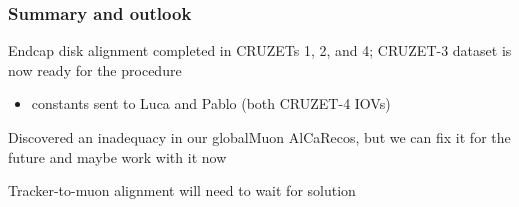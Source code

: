 \documentclass[compress]{beamer}
\begin{document}
\begin{frame}
\frametitle{Summary and outlook}

Endcap disk alignment completed in CRUZETs 1, 2, and 4; CRUZET-3
dataset is now ready for the procedure
\begin{itemize}
\item constants sent to Luca and Pablo (both CRUZET-4 IOVs)
\end{itemize}

\vfill Discovered an inadequacy in our globalMuon AlCaRecos, but we
can fix it for the future and maybe work with it now

\vfill Tracker-to-muon alignment will need to wait for solution

\label{numpages}
\end{frame}
\end{document}
